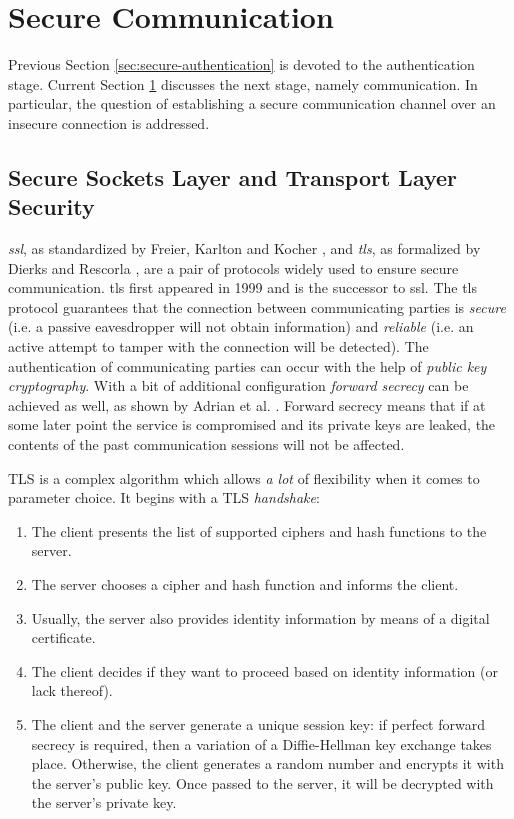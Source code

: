 \section{Secure Communication}
\label{sec:secure-communication}

Previous Section \ref{sec:secure-authentication} is devoted to the authentication stage. Current Section \ref{sec:secure-communication} discusses the next stage, namely communication. In particular, the question of establishing a secure communication channel over an insecure connection is addressed.

\subsection{Secure Sockets Layer and Transport Layer Security}
\label{sec:ssl-tls}

\emph{\gls{ssl}}, as standardized by Freier, Karlton and Kocher \cite{rfc6101}, and \emph{\gls{tls}}, as formalized by Dierks and Rescorla \cite{rfc5246}, are a pair of protocols widely used to ensure secure communication. \gls{tls} first appeared in 1999 and is the successor to \gls{ssl}. The \gls{tls} protocol guarantees that the connection between communicating parties is \emph{secure} (i.e. a passive eavesdropper will not obtain information) and \emph{reliable} (i.e. an active attempt to tamper with the connection will be detected). The authentication of communicating parties can occur with the help of \emph{public key cryptography}. With a bit of additional configuration \emph{forward secrecy} can be achieved as well, as shown by Adrian et al. \cite{Adrian:2015:IFS:2810103.2813707}. Forward secrecy means that if at some later point the service is compromised and its private keys are leaked, the contents of the past communication sessions will not be affected.

TLS is a complex algorithm which allows \emph{a lot} of flexibility when it comes to parameter choice. It begins with a TLS \emph{handshake}:

\begin{enumerate}
    \item The client presents the list of supported ciphers and hash functions to the server.
    \item The server chooses a cipher and hash function and informs the client.
    \item Usually, the server also provides identity information by means of a digital certificate.
    \item The client decides if they want to proceed based on identity information (or lack thereof).
    \item The client and the server generate a unique session key: if perfect forward secrecy is required, then a variation of a Diffie-Hellman key exchange takes place. Otherwise, the client generates a random number and encrypts it with the server's public key. Once passed to the server, it will be decrypted with the server's private key.
  \end{enumerate}


